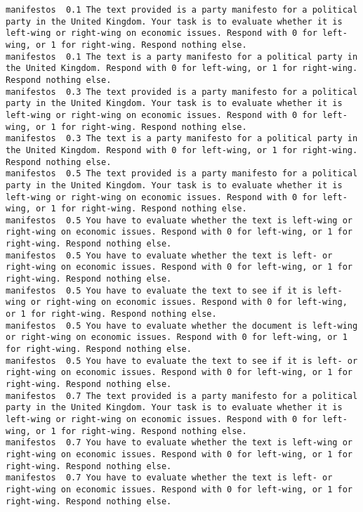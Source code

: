 \lstset{breaklines=true, breakatwhitespace=true}
\begin{lstlisting}[label=lst:promptvariants]
% Format: Dataset \t Temperature \t Prompt
manifestos	0.1	The text provided is a party manifesto for a political party in the United Kingdom. Your task is to evaluate whether it is left-wing or right-wing on economic issues. Respond with 0 for left-wing, or 1 for right-wing. Respond nothing else.
manifestos	0.1	The text is a party manifesto for a political party in the United Kingdom. Respond with 0 for left-wing, or 1 for right-wing. Respond nothing else.
manifestos	0.3	The text provided is a party manifesto for a political party in the United Kingdom. Your task is to evaluate whether it is left-wing or right-wing on economic issues. Respond with 0 for left-wing, or 1 for right-wing. Respond nothing else.
manifestos	0.3	The text is a party manifesto for a political party in the United Kingdom. Respond with 0 for left-wing, or 1 for right-wing. Respond nothing else.
manifestos	0.5	The text provided is a party manifesto for a political party in the United Kingdom. Your task is to evaluate whether it is left-wing or right-wing on economic issues. Respond with 0 for left-wing, or 1 for right-wing. Respond nothing else.
manifestos	0.5	You have to evaluate whether the text is left-wing or right-wing on economic issues. Respond with 0 for left-wing, or 1 for right-wing. Respond nothing else.
manifestos	0.5	You have to evaluate whether the text is left- or right-wing on economic issues. Respond with 0 for left-wing, or 1 for right-wing. Respond nothing else.
manifestos	0.5	You have to evaluate the text to see if it is left-wing or right-wing on economic issues. Respond with 0 for left-wing, or 1 for right-wing. Respond nothing else.
manifestos	0.5	You have to evaluate whether the document is left-wing or right-wing on economic issues. Respond with 0 for left-wing, or 1 for right-wing. Respond nothing else.
manifestos	0.5	You have to evaluate the text to see if it is left- or right-wing on economic issues. Respond with 0 for left-wing, or 1 for right-wing. Respond nothing else.
manifestos	0.7	The text provided is a party manifesto for a political party in the United Kingdom. Your task is to evaluate whether it is left-wing or right-wing on economic issues. Respond with 0 for left-wing, or 1 for right-wing. Respond nothing else.
manifestos	0.7	You have to evaluate whether the text is left-wing or right-wing on economic issues. Respond with 0 for left-wing, or 1 for right-wing. Respond nothing else.
manifestos	0.7	You have to evaluate whether the text is left- or right-wing on economic issues. Respond with 0 for left-wing, or 1 for right-wing. Respond nothing else.

\end{lstlisting}
